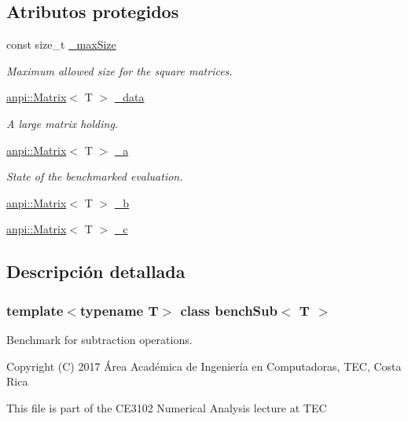 \subsection*{Atributos protegidos}
\begin{DoxyCompactItemize}
\item 
const size\+\_\+t \hyperlink{classbenchSub_a7939810564400fd0c2e26bc1d8bfb059}{\+\_\+max\+Size}
\begin{DoxyCompactList}\small\item\em Maximum allowed size for the square matrices. \end{DoxyCompactList}\item 
\hyperlink{classanpi_1_1Matrix}{anpi\+::\+Matrix}$<$ T $>$ \hyperlink{classbenchSub_aba7cdacdc02143e9f9fe9511df097f89}{\+\_\+data}
\begin{DoxyCompactList}\small\item\em A large matrix holding. \end{DoxyCompactList}\item 
\hyperlink{classanpi_1_1Matrix}{anpi\+::\+Matrix}$<$ T $>$ \hyperlink{classbenchSub_af02506fae40f68caa638a39204021a0b}{\+\_\+a}
\begin{DoxyCompactList}\small\item\em State of the benchmarked evaluation. \end{DoxyCompactList}\item 
\hyperlink{classanpi_1_1Matrix}{anpi\+::\+Matrix}$<$ T $>$ \hyperlink{classbenchSub_a9bf77fe2081cf478d58358632e719c1e}{\+\_\+b}
\item 
\hyperlink{classanpi_1_1Matrix}{anpi\+::\+Matrix}$<$ T $>$ \hyperlink{classbenchSub_aff8c800d696bc6aeb44259f43fa4457c}{\+\_\+c}
\end{DoxyCompactItemize}


\subsection{Descripción detallada}
\subsubsection*{template$<$typename T$>$\newline
class bench\+Sub$<$ T $>$}

Benchmark for subtraction operations. 

Copyright (C) 2017 Área Académica de Ingeniería en Computadoras, T\+EC, Costa Rica

This file is part of the C\+E3102 Numerical Analysis lecture at T\+EC

